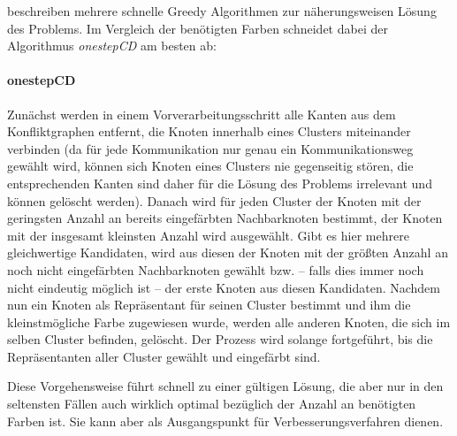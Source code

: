\documentclass[paper=a4,fontsize=12pt]{scrartcl}
\begin{document}
\citet*{Li2000} beschreiben mehrere schnelle Greedy Algorithmen zur näherungsweisen Lösung des Problems. Im Vergleich der benötigten Farben schneidet dabei der Algorithmus \emph{onestepCD} am besten ab:

\paragraph{onestepCD}{
\label{sec:construct}
Zunächst werden in einem Vorverarbeitungsschritt alle Kanten aus dem Konfliktgraphen entfernt, die Knoten innerhalb eines Clusters miteinander verbinden (da für jede Kommunikation nur genau ein Kommunikationsweg gewählt wird, können sich Knoten eines Clusters nie gegenseitig stören, die entsprechenden Kanten sind daher für die Lösung des Problems irrelevant und können gelöscht werden). Danach wird für jeden Cluster der Knoten mit der geringsten Anzahl an bereits eingefärbten Nachbarknoten bestimmt, der Knoten mit der insgesamt kleinsten Anzahl wird ausgewählt. Gibt es hier mehrere gleichwertige Kandidaten, wird aus diesen der Knoten mit der größten Anzahl an noch nicht eingefärbten Nachbarknoten gewählt bzw. -- falls dies immer noch nicht eindeutig möglich ist -- der erste Knoten aus diesen Kandidaten. Nachdem nun ein Knoten als Repräsentant für seinen Cluster bestimmt und ihm die kleinstmögliche Farbe zugewiesen wurde, werden alle anderen Knoten, die sich im selben Cluster befinden, gelöscht. Der Prozess wird solange fortgeführt, bis die Repräsentanten aller Cluster gewählt und eingefärbt sind.
}

Diese Vorgehensweise führt schnell zu einer gültigen Lösung, die aber nur in den seltensten Fällen auch wirklich optimal bezüglich der Anzahl an benötigten Farben ist. Sie kann aber als Ausgangspunkt für Verbesserungsverfahren dienen.
 
\end{document}
